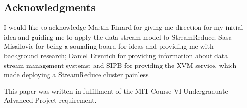\documentclass[12pt,twocolumn]{article}
\begin{document}
\subsection*{Acknowledgments}
I would like to acknowledge Martin Rinard for giving me direction for my initial idea
and guiding me to apply the data stream model to StreamReduce; Sasa Misailovic for being
a sounding board for ideas and providing me with background research; Daniel Erenrich for
providing information about data stream management systems; and SIPB for providing the
XVM service, which made deploying a StreamReduce cluster painless.

This paper was written in fulfillment of the MIT Course VI Undergraduate Advanced Project
requirement.

{}

\end{document}
